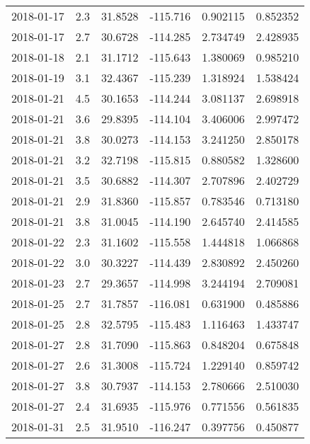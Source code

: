 \begin{tabular}{lrrrrr}
2018-01-17 &       2.3 &  31.8528 &  -115.716 &         0.902115 &         0.852352 \\
2018-01-17 &       2.7 &  30.6728 &  -114.285 &         2.734749 &         2.428935 \\
2018-01-18 &       2.1 &  31.1712 &  -115.643 &         1.380069 &         0.985210 \\
2018-01-19 &       3.1 &  32.4367 &  -115.239 &         1.318924 &         1.538424 \\
2018-01-21 &       4.5 &  30.1653 &  -114.244 &         3.081137 &         2.698918 \\
2018-01-21 &       3.6 &  29.8395 &  -114.104 &         3.406006 &         2.997472 \\
2018-01-21 &       3.8 &  30.0273 &  -114.153 &         3.241250 &         2.850178 \\
2018-01-21 &       3.2 &  32.7198 &  -115.815 &         0.880582 &         1.328600 \\
2018-01-21 &       3.5 &  30.6882 &  -114.307 &         2.707896 &         2.402729 \\
2018-01-21 &       2.9 &  31.8360 &  -115.857 &         0.783546 &         0.713180 \\
2018-01-21 &       3.8 &  31.0045 &  -114.190 &         2.645740 &         2.414585 \\
2018-01-22 &       2.3 &  31.1602 &  -115.558 &         1.444818 &         1.066868 \\
2018-01-22 &       3.0 &  30.3227 &  -114.439 &         2.830892 &         2.450260 \\
2018-01-23 &       2.7 &  29.3657 &  -114.998 &         3.244194 &         2.709081 \\
2018-01-25 &       2.7 &  31.7857 &  -116.081 &         0.631900 &         0.485886 \\
2018-01-25 &       2.8 &  32.5795 &  -115.483 &         1.116463 &         1.433747 \\
2018-01-27 &       2.8 &  31.7090 &  -115.863 &         0.848204 &         0.675848 \\
2018-01-27 &       2.6 &  31.3008 &  -115.724 &         1.229140 &         0.859742 \\
2018-01-27 &       3.8 &  30.7937 &  -114.153 &         2.780666 &         2.510030 \\
2018-01-27 &       2.4 &  31.6935 &  -115.976 &         0.771556 &         0.561835 \\
2018-01-31 &       2.5 &  31.9510 &  -116.247 &         0.397756 &         0.450877 \\

\end{tabular}
